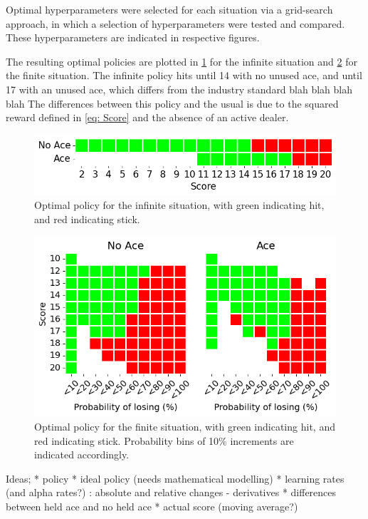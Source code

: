 Optimal hyperparameters were selected for each situation via a grid-search approach, in which a selection of hyperparameters were tested and compared. These hyperparameters are indicated in respective figures. 

The resulting optimal policies are plotted in \ref{fig: Optimal policy - Infinite} for the infinite situation and \ref{fig: Optimal policy - Finite} for the finite situation. The infinite policy hits until 14 with no unused ace, and until 17 with an unused ace, which differs from the industry standard blah blah blah blah
The differences between this policy and the usual is due to the squared reward defined in \ref{eq: Score} and the absence of an active dealer. 


\begin{figure}[ht]
    \centering
    \includegraphics[width=\singlefigure]{figures/infinite_optimal_policy.png}
    \caption{Optimal policy for the infinite situation, with green indicating hit, and red indicating stick.}
    \label{fig: Optimal policy - Infinite} 
\end{figure}

\begin{figure}[ht]
    \centering
    \includegraphics[width=\singlefigure]{figures/finite_optimal_policy.png}
    \caption{Optimal policy for the finite situation, with green indicating hit, and red indicating stick. Probability bins of 10\% increments are indicated accordingly.}
    \label{fig: Optimal policy - Finite} 
\end{figure}

Ideas;
* policy
* ideal policy (needs mathematical modelling)
* learning rates (and alpha rates?) : absolute and relative changes - derivatives
* differences between held ace and no held ace
* actual score (moving average?)